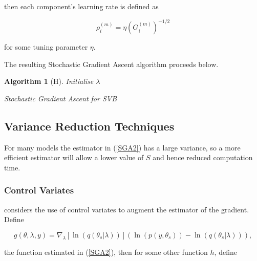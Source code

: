 \documentclass{article}\usepackage[]{graphicx}\usepackage[]{color}
\newtheorem{algorithm}[theorem]{Algorithm}
\begin{document}
then each component's learning rate is defined as

\begin{equation}
\label{SGA4}
\rho^{(m)}_i = \eta \left(G_i^{(m)}\right)^{-1/2}
\end{equation}

for some tuning parameter $\eta$.

The resulting Stochastic Gradient Ascent algorithm proceeds below.

\begin{algorithm}[H]
 Initialise $\lambda$\;
 \caption{Stochastic Gradient Ascent for SVB}
  \label{alg:algorithm2}
\end{algorithm}

\subsection{Variance Reduction Techniques}

For many models the estimator in (\ref{SGA2}) has a large variance, so a more efficient estimator will allow a lower value of $S$ and hence reduced computation time.
\subsubsection{Control Variates}
\citet{Paisley2012} considers the use of control variates to augment the estimator of the gradient. Define

\begin{equation}
\label{CV1}
g(\theta, \lambda, y) =  \nabla_{\lambda} [\ln(q(\theta_s | \lambda))] (\ln (p(y, \theta_s)) - \ln(q(\theta_s | \lambda))),
\end{equation}

the function estimated in (\ref{SGA2}), then for some other function $h$, define
\end{document}
